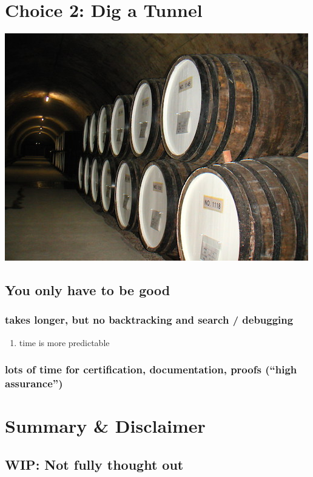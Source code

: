 \documentclass[10pt,oneside,x11names]{article}
\begin{document}
\section{Choice 2: Dig a Tunnel}
\label{sec:org7d64b02}
\begin{center}
\includegraphics[width=.9\linewidth]{./whiskey_tunnel_desc01.jpg}
\end{center}
\subsection{You only have to be good}
\label{sec:orgac5c026}
\subsubsection{takes longer, but no backtracking and search / debugging}
\label{sec:orgbb56ab5}
\begin{enumerate}
\item time is more predictable
\label{sec:org70a5a94}
\end{enumerate}
\subsubsection{lots of time for certification, documentation, proofs (``high assurance'')}
\label{sec:org89bdb78}

\section{Summary \& Disclaimer}
\label{sec:org7a1214c}
\subsection{WIP: Not fully thought out}
\label{sec:orge1fc041}
\end{document}
